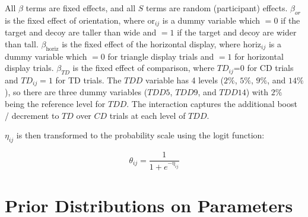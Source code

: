 All $\beta$ terms are fixed effects, and all $S$ terms are random (participant) effects. $\beta_{or}$ is the fixed effect of orientation, where $\text{or}_{ij}$ is a dummy variable which $=0$ if the target and decoy are taller than wide and $=1$ if the target and decoy are wider than tall. $\beta_{\mathrm{horiz}}$ is the fixed effect of the horizontal display, where $\mathrm{horiz}_{ij}$ is a dummy variable which $=0$ for triangle display trials and $=1$ for horizontal display trials. $\beta_{TD}$ is the fixed effect of comparison, where $TD_{ij}$=0 for CD trials and $TD_{ij}=1$ for TD trials.  The $TDD$ variable has 4 levels ($2\%$, $5\%$, $9\%$, and $14\%$), so there are three dummy variables ($TDD5$, $TDD9$, and $TDD14$) with $2\%$ being the reference level for $TDD$. The interaction captures the additional boost / decrement to $TD$ over $CD$ trials at each level of $TDD$. 

$\eta_{ij}$ is then transformed to the probability scale using the logit function:

\begin{equation}
    \theta_{ij}=\frac{1}{1+e^{-\eta_{ij}}}
\end{equation}

\section{Prior Distributions on Parameters}

